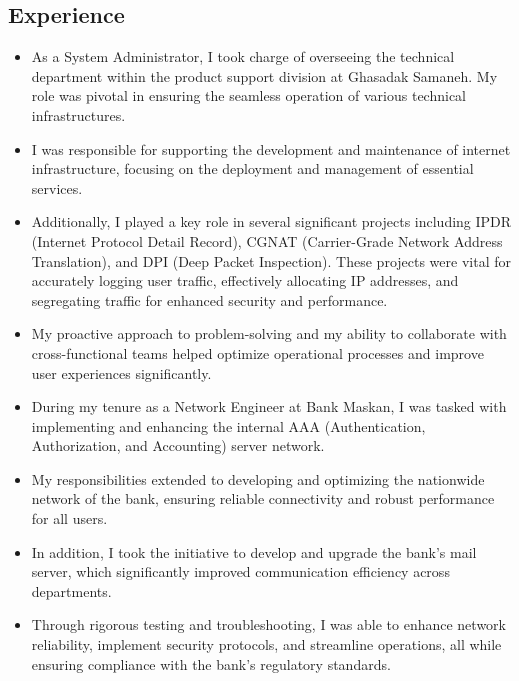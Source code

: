 \documentclass[../main.tex]{subfiles}
\begin{document}
\begin{category}
    \section{Experience}

    \begin{itemize}
        \item As a System Administrator, I took charge of overseeing the technical department within the product support division at Ghasadak Samaneh. My role was pivotal in ensuring the seamless operation of various technical infrastructures.
        \item I was responsible for supporting the development and maintenance of internet infrastructure, focusing on the deployment and management of essential services.
        \item Additionally, I played a key role in several significant projects including IPDR (Internet Protocol Detail Record), CGNAT (Carrier-Grade Network Address Translation), and DPI (Deep Packet Inspection). These projects were vital for accurately logging user traffic, effectively allocating IP addresses, and segregating traffic for enhanced security and performance.
        \item My proactive approach to problem-solving and my ability to collaborate with cross-functional teams helped optimize operational processes and improve user experiences significantly.
    \end{itemize}

    \begin{itemize}
        \item During my tenure as a Network Engineer at Bank Maskan, I was tasked with implementing and enhancing the internal AAA (Authentication, Authorization, and Accounting) server network.
        \item My responsibilities extended to developing and optimizing the nationwide network of the bank, ensuring reliable connectivity and robust performance for all users.
        \item In addition, I took the initiative to develop and upgrade the bank's mail server, which significantly improved communication efficiency across departments.
        \item Through rigorous testing and troubleshooting, I was able to enhance network reliability, implement security protocols, and streamline operations, all while ensuring compliance with the bank's regulatory standards.
    \end{itemize}


\end{category}
\end{document}
